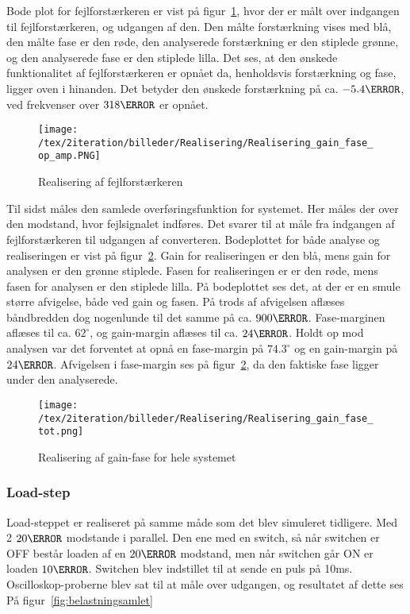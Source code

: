 Bode plot for fejlforstærkeren er vist på figur~\ref{fig:Realisering_error_op_amp_2}, hvor der er målt over indgangen til fejlforstærkeren, og udgangen af den. Den målte forstærkning vises med blå, den målte fase er den røde, den analyserede forstærkning er den stiplede grønne, og den analyserede fase er den stiplede lilla. Det ses, at den ønskede funktionalitet af fejlforstærkeren er opnået da, henholdsvis forstærkning og fase, ligger oven i hinanden. Det betyder den ønskede forstærkning på ca. $-5.4\decibel$, ved frekvenser over $318\hertz$ er opnået. 

\begin{figure}[H]
	\center
	\texttt{[image: /tex/2iteration/billeder/Realisering/Realisering\_gain\_fase\_op\_amp.PNG]}
	\caption{Realisering af fejlforstærkeren}
	\label{fig:Realisering_error_op_amp_2}
\end{figure}



Til sidst måles den samlede overføringsfunktion for systemet. Her måles der over den modstand, hvor fejlsignalet indføres. Det svarer til at måle fra indgangen af fejlforstærkeren til udgangen af converteren. Bodeplottet for både analyse og realiseringen er vist på figur~\ref{fig:realisering_gain_fase_tot}. Gain for realiseringen er den blå, mens gain for analysen er den grønne stiplede. Fasen for realiseringen er er den røde, mens fasen for analysen er den stiplede lilla. På bodeplottet ses det, at der er en smule større afvigelse, både ved gain og fasen. På trods af afvigelsen aflæses båndbredden dog nogenlunde til det samme på ca. $900\hertz$. Fase-marginen aflæses til ca. $62^\circ$, og gain-margin aflæses til ca. $24\decibel$. Holdt op mod analysen var det forventet at opnå en fase-margin på $74.3^\circ$ og en gain-margin på $24\decibel$. Afvigelsen i fase-margin ses på figur~\ref{fig:realisering_gain_fase_tot}, da den faktiske fase ligger under den analyserede. 

\begin{figure}[H]
	\center
	\texttt{[image: /tex/2iteration/billeder/Realisering/Realisering\_gain\_fase\_tot.png]}
	\caption{Realisering af gain-fase for hele systemet}
	\label{fig:realisering_gain_fase_tot}
\end{figure}



\subsubsection{Load-step} \label{loadsteprea}
\noindent Load-steppet er realiseret på samme måde som det blev simuleret tidligere. Med 2 $20\ohm$ modstande i parallel. Den ene med en switch, så når switchen er OFF består loaden af en $20\ohm$ modstand, men når switchen går ON er loaden $10\ohm$. Switchen blev indstillet til at sende en puls på 10ms. Oscilloskop-proberne blev sat til at måle over udgangen, og resultatet af dette ses På figur~\ref{fig:belastningsamlet} 

